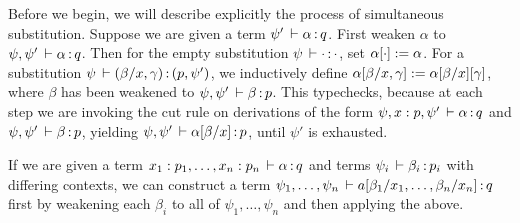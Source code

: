 Before we begin, we will describe explicitly the process of simultaneous substitution. Suppose we are given a term $\psi' \, \vdash \alpha \, \mathit{:} \, q$. First weaken $\alpha$ to $\psi, \psi' \, \vdash \alpha \, \mathit{:} \, q$. Then for the empty substitution $\psi \, \vdash \cdot \, \mathit{:} \, \cdot$, set $\alpha[\cdot] := \alpha$. For a substitution $\psi \, \vdash (\beta/x, \gamma) \, \mathit{:} \, (p, \psi')$, we inductively define $\alpha[\beta/x,\gamma] := \alpha[\beta/x][\gamma]$, where $\beta$ has been weakened to $\psi, \psi' \, \vdash \beta \, \mathit{:} \, p$. This typechecks, because at each step we are invoking the cut rule on derivations of the form $\psi, x:p, \psi' \, \vdash \alpha \, \mathit{:} \, q$ and $\psi, \psi' \, \vdash \beta \, \mathit{:} \, p$, yielding $\psi, \psi' \, \vdash \alpha[\beta/x] \, \mathit{:} \, p$, until $\psi'$ is exhausted.

If we are given a term $x_1:p_1, \dots, x_n:p_n \, \vdash \alpha \, \mathit{:} \, q$ and terms $\psi_i \, \vdash \beta_i \, \mathit{:} \, p_i$ with differing contexts, we can construct a term $\psi_1, \dots, \psi_n \, \vdash a[\beta_1/x_1, \dots, \beta_n/x_n] \, \mathit{:} \, q$ first by weakening each $\beta_i$ to all of $\psi_1, \dots, \psi_n$ and then applying the above.

